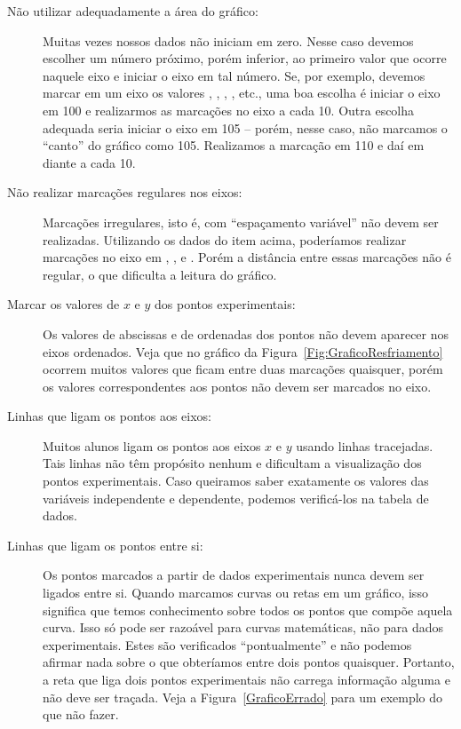 \begin{description}
	\item[Não utilizar adequadamente a área do gráfico:] Muitas vezes nossos dados não iniciam em zero. Nesse caso devemos escolher um número próximo, porém inferior, ao primeiro valor que ocorre naquele eixo e iniciar o eixo em tal número. Se, por exemplo, devemos marcar em um eixo os valores , , , , etc., uma boa escolha é iniciar o eixo em 100 e realizarmos as marcações no eixo a cada 10. Outra escolha adequada seria iniciar o eixo em 105 -- porém, nesse caso, não marcamos o ``canto'' do gráfico como 105. Realizamos a marcação em 110 e daí em diante a cada 10.
	\item[Não realizar marcações regulares nos eixos:] Marcações irregulares, isto é, com ``espaçamento variável'' não devem ser realizadas. Utilizando os dados do item acima, poderíamos realizar marcações no eixo em , ,  e . Porém a distância entre essas marcações não é regular, o que dificulta a leitura do gráfico.
	\item[Marcar os valores de $x$ e $y$ dos pontos experimentais:] Os valores de abscissas e de ordenadas dos pontos não devem aparecer nos eixos ordenados. Veja que no gráfico da Figura~\ref{Fig:GraficoResfriamento} ocorrem muitos valores que ficam entre duas marcações quaisquer, porém os valores correspondentes aos pontos não devem ser marcados no eixo.
	\item[Linhas que ligam os pontos aos eixos:] Muitos alunos ligam os pontos aos eixos $x$ e $y$ usando linhas tracejadas. Tais linhas não têm propósito nenhum e dificultam a visualização dos pontos experimentais. Caso queiramos saber exatamente os valores das variáveis independente e dependente, podemos verificá-los na tabela de dados.
	\item[Linhas que ligam os pontos entre si:] Os pontos marcados a partir de dados experimentais nunca devem ser ligados entre si. Quando marcamos curvas ou retas em um gráfico, isso significa que temos conhecimento sobre todos os pontos que compõe aquela curva. Isso só pode ser razoável para curvas matemáticas, não para dados experimentais. Estes são verificados ``pontualmente'' e não podemos afirmar nada sobre o que obteríamos entre dois pontos quaisquer. Portanto, a reta que liga dois pontos experimentais não carrega informação alguma e não deve ser traçada. Veja a Figura~\ref{GraficoErrado} para um exemplo do que não fazer.
\end{description}

